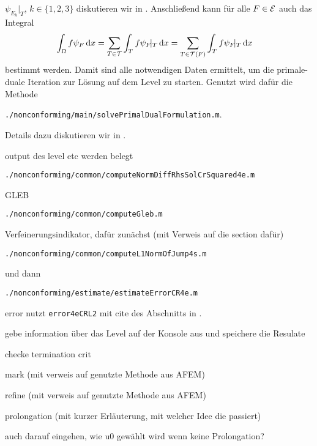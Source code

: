 $\psi_{E_k}\!|_T$, $k\in\{1,2,3\}$ diskutieren wir in
.
Anschließend kann für alle $F\in\mathcal{E}$ auch das Integral 
\begin{align*}
  \int_\Omega f\psi_F\,\mathrm{d}x
  &=
  \sum_{T\in\mathcal{T}}\int_T f\psi_F\!|_T\,\mathrm{d}x
  =
  \sum_{T\in\mathcal{T}(F)}\int_T f\psi_F\!|_T\,\mathrm{d}x
\end{align*}
bestimmt werden.
Damit sind alle notwendigen Daten ermittelt, um die primale-duale Iteration 
zur Lösung auf dem Level zu starten. Genutzt wird dafür die Methode
\begin{center}
  \texttt{./nonconforming/main/solvePrimalDualFormulation.m}.
\end{center}
Details dazu diskutieren wir in .


\bigskip output des level etc werden belegt

\bigskip
\begin{center}
  \texttt{./nonconforming/common/computeNormDiffRhsSolCrSquared4e.m}
\end{center}


\bigskip GLEB
\begin{center}
  \texttt{./nonconforming/common/computeGleb.m}
\end{center}

\bigskip  Verfeinerungsindikator, dafür zunächst (mit Verweis auf die section
dafür)
\begin{center}
  \texttt{./nonconforming/common/computeL1NormOfJump4s.m}
\end{center}
und dann 
\begin{center}
  \texttt{./nonconforming/estimate/estimateErrorCR4e.m}
\end{center}

\bigskip error nutzt \texttt{error4eCRL2} mit cite des Abschnitts in
\cite{CGKNRR10}.

\bigskip gebe information über das Level auf der Konsole aus und
speichere die Resulate

\bigskip checke termination crit

\bigskip mark (mit verweis auf genutzte Methode aus AFEM)

\bigskip refine (mit verweis auf genutzte Methode aus AFEM)

\bigskip prolongation (mit kurzer Erläuterung, mit welcher Idee die passiert)

auch darauf eingehen, wie u0 gewählt wird wenn keine Prolongation?

